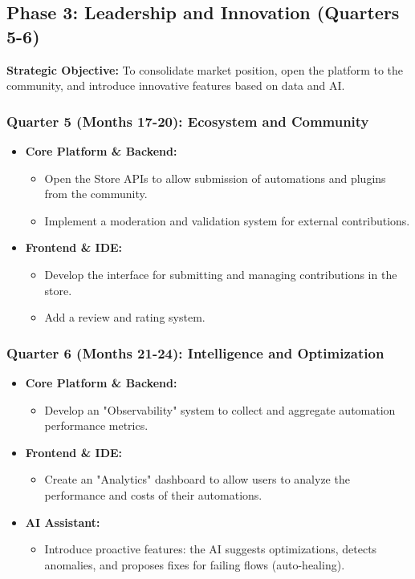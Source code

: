 
\subsection{Phase 3: Leadership and Innovation (Quarters 5-6)}
\textbf{Strategic Objective:} To consolidate market position, open the platform to the community, and introduce innovative features based on data and AI.

\subsubsection*{Quarter 5 (Months 17-20): Ecosystem and Community}
\begin{itemize}[leftmargin=*]
    \item \textbf{Core Platform \& Backend:}
    \begin{itemize}
        \item Open the Store APIs to allow submission of automations and plugins from the community.
        \item Implement a moderation and validation system for external contributions.
    \end{itemize}
    \item \textbf{Frontend \& IDE:}
    \begin{itemize}
        \item Develop the interface for submitting and managing contributions in the store.
        \item Add a review and rating system.
    \end{itemize}
\end{itemize}

\subsubsection*{Quarter 6 (Months 21-24): Intelligence and Optimization}
\begin{itemize}[leftmargin=*]
    \item \textbf{Core Platform \& Backend:}
    \begin{itemize}
        \item Develop an "Observability" system to collect and aggregate automation performance metrics.
    \end{itemize}
    \item \textbf{Frontend \& IDE:}
    \begin{itemize}
        \item Create an "Analytics" dashboard to allow users to analyze the performance and costs of their automations.
    \end{itemize}
    \item \textbf{AI Assistant:}
    \begin{itemize}
        \item Introduce proactive features: the AI suggests optimizations, detects anomalies, and proposes fixes for failing flows (auto-healing).
    \end{itemize}
\end{itemize}
